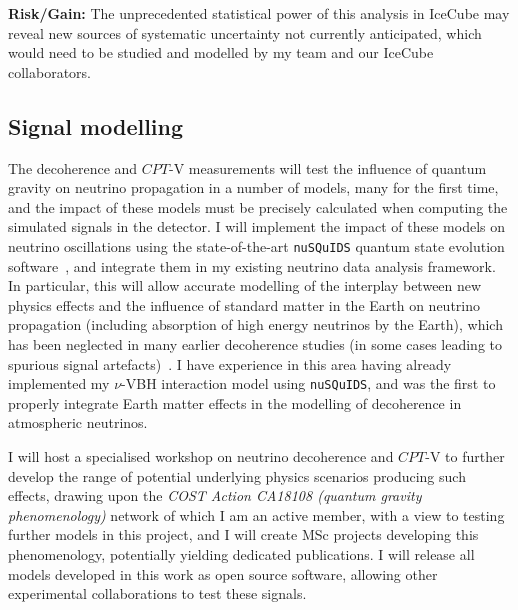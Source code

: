 \documentclass[a4paper,11pt]{article}
\begin{document}
\textbf{Risk/Gain:} The unprecedented statistical power of this analysis in IceCube may reveal new sources of systematic uncertainty not currently anticipated, which would need to be studied and modelled by my team and our IceCube collaborators. \\

\subsection{Signal modelling}

The decoherence and $CPT$-V measurements will test the influence of quantum gravity on neutrino propagation in a number of models, many for the first time, and the impact of these models must be precisely calculated when computing the simulated signals in the detector. I will implement the impact of these models on neutrino oscillations using the state-of-the-art \texttt{nuSQuIDS} quantum state evolution software~\cite{Delgado:2014kpa, nusquidsGIT}, and integrate them in my existing neutrino data analysis framework. In particular, this will allow accurate modelling of the interplay between new physics effects and the influence of standard matter in the Earth on neutrino propagation (including absorption of high energy neutrinos by the Earth), which has been neglected in many earlier decoherence studies (in some cases leading to spurious signal artefacts)~\cite{PhysRevD.97.115017}. I have experience in this area having already implemented my $\nu$-VBH interaction model using \texttt{nuSQuIDS}, and was the first to properly integrate Earth matter effects in the modelling of decoherence in atmospheric neutrinos.

I will host a specialised workshop on neutrino decoherence and $CPT$-V to further develop the range of potential underlying physics scenarios producing such effects, drawing upon the \textit{COST Action CA18108 (quantum gravity phenomenology)} network of which I am an active member, with a view to testing further models in this project, and I will create MSc projects developing this phenomenology, potentially yielding dedicated publications. I will release all models developed in this work as open source software, allowing other experimental collaborations to test these signals.  \\

\end{document}
